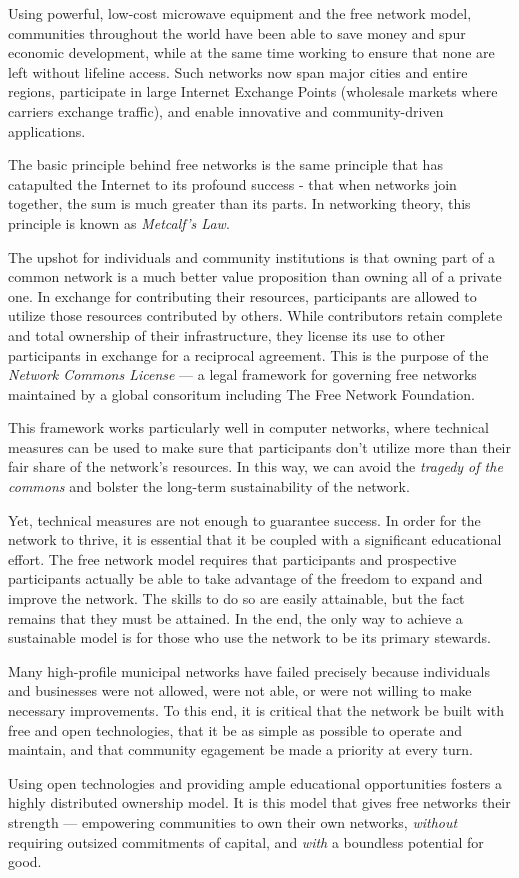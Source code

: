 Using powerful, low-cost  microwave equipment and the free network model,
communities throughout the world have been able to save money and spur economic
development, while at the same time
working to ensure that none are left without lifeline access. Such networks now
span major cities and entire regions, participate in large Internet Exchange Points
(wholesale markets where carriers exchange traffic), and enable innovative and community-driven 
applications. \par
The basic principle behind free networks is the same principle that has
catapulted the Internet to its profound success - that when networks join
together, the sum is much greater than its parts. In networking theory, this
principle is known as \emph{Metcalf's Law}. \par 
The upshot for individuals and community institutions is that owning part of a
common network is a much better value proposition than owning all of a private
one. In exchange for contributing their resources, participants are
allowed to utilize those resources contributed by others. While contributors
retain complete and total ownership of their infrastructure, they license its
use to other participants in exchange for a reciprocal agreement. This is the
purpose of the \emph{Network Commons License} --- a legal framework for
governing free networks maintained by a global consoritum including The Free
Network Foundation. \par
This framework works particularly well in computer networks, where technical
measures can be used to make sure that participants don't utilize more than
their fair share of the network's resources.
In this way, we can avoid the \emph{tragedy of the commons}
and bolster the long-term sustainability of the network. \par
Yet, technical measures are not enough to guarantee success. In order for the
network to thrive, it is essential that it be coupled with a significant
educational effort. The free network model requires that participants and
prospective participants actually be able to take advantage of the freedom to
expand and improve the network. The skills to do so are easily attainable, but
the fact remains that they must be attained. In the end, the only way to achieve
a sustainable model is for those who use the network to be its primary stewards.\par
Many high-profile municipal networks have failed precisely because individuals
and businesses were not allowed, were not able, or were not willing to make necessary improvements.
To this end, it is critical that the network be built with free and open
technologies, that it be as simple as possible to operate and maintain, and
that community egagement be made a priority at every turn.\par
Using open technologies and providing ample educational opportunities fosters
a highly distributed ownership model. It is this model that gives free networks
their strength --- empowering communities to own their own networks,
\emph{without} requiring outsized commitments of capital, and \emph{with} a
boundless potential for good.

